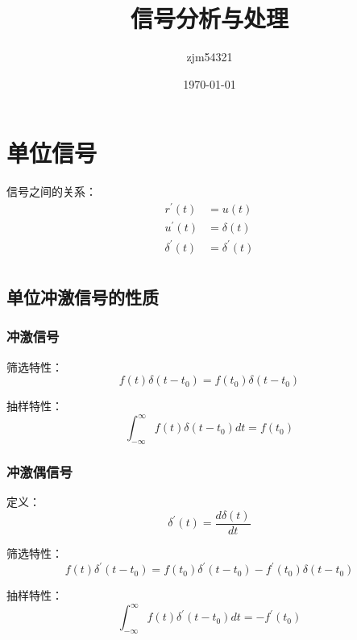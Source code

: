 \documentclass[UTF8]{ctexart}
\title{信号分析与处理}
\author{zjm54321}
\date{\today}
\begin{document}
    \maketitle

    \section{单位信号}
    
    \begin{tcolorbox}[green]
    信号之间的关系：
        \begin{equation*}
            \begin{aligned}
                r^\prime (t) &= u(t)\\
                u^\prime (t) &= \delta (t)\\
                \delta^\prime (t) &= \delta^\prime (t)\\
            \end{aligned}
        \end{equation*}
    \end{tcolorbox}

    \subsection{单位冲激信号的性质}

    \subsubsection{冲激信号}

    筛选特性：
    $$ f(t)\delta (t-t_0) = f(t_0)\delta (t-t_0) $$

    抽样特性：
    $$ \int_{-\infty}^{\infty}f(t)\delta (t-t_0)dt = f(t_0) $$

    \subsubsection{冲激偶信号}

    定义：
    $$ \delta^\prime (t) = \frac{d \delta (t)}{d t} $$

    筛选特性：
    $$ f(t)\delta^\prime (t-t_0) = f(t_0)\delta^\prime (t-t_0) -f^\prime (t_0)\delta(t-t_0) $$

    抽样特性：
    $$ \int_{-\infty}^{\infty}f(t)\delta^\prime (t-t_0)dt = -f^\prime (t_0) $$
\end{document}
